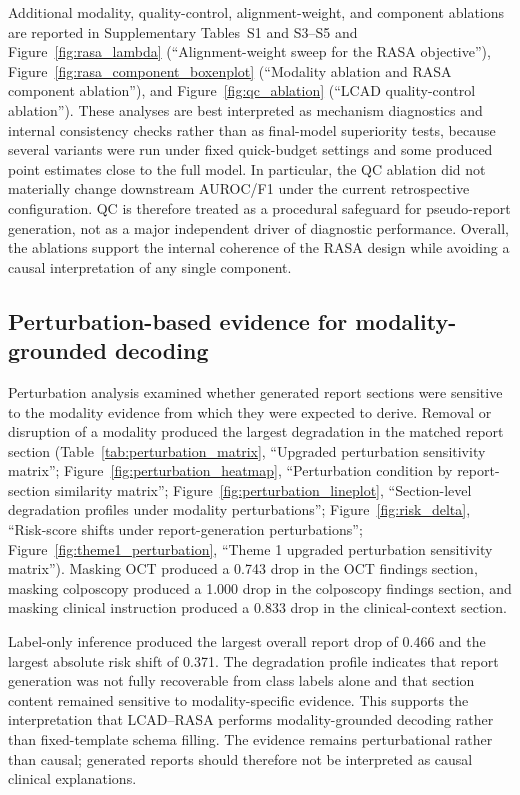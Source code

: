 Additional modality, quality-control, alignment-weight, and component ablations are reported in Supplementary Tables~S1 and S3--S5 and Figure~\ref{fig:rasa_lambda} (``Alignment-weight sweep for the RASA objective''), Figure~\ref{fig:rasa_component_boxenplot} (``Modality ablation and RASA component ablation''), and Figure~\ref{fig:qc_ablation} (``LCAD quality-control ablation''). These analyses are best interpreted as mechanism diagnostics and internal consistency checks rather than as final-model superiority tests, because several variants were run under fixed quick-budget settings and some produced point estimates close to the full model. In particular, the QC ablation did not materially change downstream AUROC/F1 under the current retrospective configuration. QC is therefore treated as a procedural safeguard for pseudo-report generation, not as a major independent driver of diagnostic performance. Overall, the ablations support the internal coherence of the RASA design while avoiding a causal interpretation of any single component.

\subsection{Perturbation-based evidence for modality-grounded decoding}
\label{subsec:perturbation_results}

Perturbation analysis examined whether generated report sections were sensitive to the modality evidence from which they were expected to derive. Removal or disruption of a modality produced the largest degradation in the matched report section (Table~\ref{tab:perturbation_matrix}, ``Upgraded perturbation sensitivity matrix''; Figure~\ref{fig:perturbation_heatmap}, ``Perturbation condition by report-section similarity matrix''; Figure~\ref{fig:perturbation_lineplot}, ``Section-level degradation profiles under modality perturbations''; Figure~\ref{fig:risk_delta}, ``Risk-score shifts under report-generation perturbations''; Figure~\ref{fig:theme1_perturbation}, ``Theme 1 upgraded perturbation sensitivity matrix''). Masking OCT produced a 0.743 drop in the OCT findings section, masking colposcopy produced a 1.000 drop in the colposcopy findings section, and masking clinical instruction produced a 0.833 drop in the clinical-context section.

Label-only inference produced the largest overall report drop of 0.466 and the largest absolute risk shift of 0.371. The degradation profile indicates that report generation was not fully recoverable from class labels alone and that section content remained sensitive to modality-specific evidence. This supports the interpretation that LCAD--RASA performs modality-grounded decoding rather than fixed-template schema filling. The evidence remains perturbational rather than causal; generated reports should therefore not be interpreted as causal clinical explanations.

